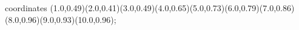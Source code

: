 					coordinates { (1.0,0.49)(2.0,0.41)(3.0,0.49)(4.0,0.65)(5.0,0.73)(6.0,0.79)(7.0,0.86)(8.0,0.96)(9.0,0.93)(10.0,0.96)};